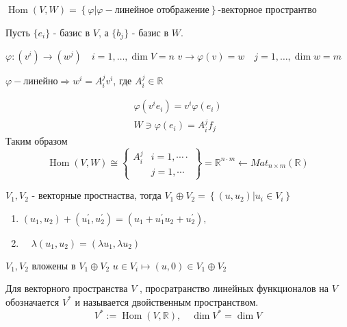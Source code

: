 $
\operatorname{Hom}(V, W)= \left\{\varphi | \varphi - \text{линейное отображение} \right\} 
$-векторное пространтво	 
\begin{exercise}
	Пусть $ \{e_i\} $ - базис в $ V $, а $\{b_j\} $ - базис в $ W $.
\end{exercise}

$\varphi :\left(v^{i}\right) \rightarrow\left(w^{j}\right) \quad i=1, \ldots, \operatorname{dim} V=n$
$v \rightarrow \varphi(v)=w \quad j=1, \ldots, \operatorname{dim} w=m$

$\varphi - \text{линейно} \Longrightarrow w^{i}=A_{i}^{j} v^{i}$, где $ A_{i}^{j} \in \mathbb{R} $

$$
\begin{array}{c}{\varphi\left(v^{i} e_{i}\right)=v^{i} \varphi\left(e_{i}\right)} \\ {W \ni \varphi\left(e_{i}\right)=A_{i}^{j} f_{j}}\end{array}
$$
Таким образом 
$$
\operatorname{Hom}(V, W) \cong 
\left\{\begin{array}{ll}{A_{i}^{j}}  &i=1, \cdots \cdot \\ & j=1, \cdots \end{array}\right\} = \mathbb{R}^{n \cdot m} \longleftarrow M a t_{n \times m}(\mathbb{R})
$$

\begin{definition}
	$V_1, V_2$ - векторные простнаства, тогда $V_{1} \oplus V_{2}=\left\{\left(u, u_{2}\right) | u_{i} \in V_{i}\right\}$
	

	\begin{enumerate}
		\item 
		$\left(u_{1}, u_{2}\right)+\left(u_{1}^{\prime}, u_{2}^{\prime}\right)=\left(u_{1}+u_{1}^{\prime}\right.
		\left.u_{2}+u_{2}^{\prime}\right),$
		\item 
		$ \quad \lambda\left(u_{1}, u_{2}\right)=\left(\lambda u_{1}, \lambda u_{2}\right) $
	\end{enumerate}

\end{definition}

$V_{1}, V_{2}$ вложены в $V_{1} \oplus V_{2}$ $ u \in V_i \longmapsto(u, 0) \in V_{1} \oplus V_{2} $

\begin{definition}
	Для векторного пространства $ V $ , просратранство линейных функционалов на $ V $ обозначается $ V^{*}$ и называется двойственным пространством. 
	$$V^{*} :=\operatorname{Hom}(V, \mathbb{R}), \quad \operatorname{dim} V^{*}=\operatorname{dim} V $$
\end{definition}

